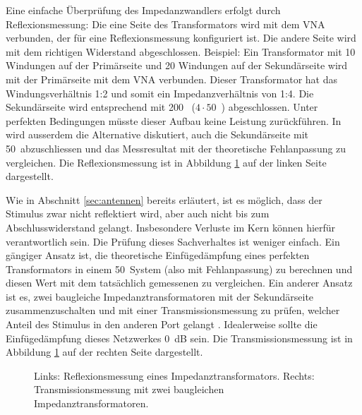 \documentclass[twoside,a4paper,11pt,halfparskip,DIV=11,notitlepage]{scrartcl}
\begin{document}
Eine einfache Überprüfung des Impedanzwandlers erfolgt durch Reflexionsmessung: Die eine Seite
des Transformators wird mit dem VNA verbunden, der für eine Reflexionsmessung konfiguriert ist.
Die andere Seite wird mit dem richtigen Widerstand abgeschlossen. Beispiel: Ein Transformator
mit 10 Windungen auf der Primärseite und 20 Windungen auf der Sekundärseite
wird mit der Primärseite mit dem VNA verbunden. Dieser Transformator hat das Windungsverhältnis
1:2 und somit ein Impedanzverhältnis von 1:4. Die Sekundärseite wird entsprechend mit 200~\Ohm
($4\cdot 50$~\Ohm) abgeschlossen. Unter perfekten Bedingungen müsste dieser Aufbau keine
Leistung zurückführen. In \cite{ferreira2019evaluating} wird ausserdem die Alternative diskutiert,
auch die Sekundärseite mit 50~\Ohm abzuschliessen und das Messresultat mit der theoretische
Fehlanpassung zu vergleichen. Die Reflexionsmessung ist in Abbildung \ref{fig:impedancetransformermeasurement}
auf der linken Seite dargestellt.

Wie in Abschnitt \ref{sec:antennen} bereits erläutert, ist es möglich, dass der Stimulus zwar
nicht reflektiert wird, aber auch nicht bis zum Abschlusswiderstand gelangt. Insbesondere
Verluste im Kern können hierfür verantwortlich sein. Die Prüfung dieses Sachverhaltes ist
weniger einfach. Ein gängiger Ansatz ist, die theoretische Einfügedämpfung eines perfekten
Transformators in einem 50~\Ohm System (also mit Fehlanpassung) zu berechnen und diesen
Wert mit dem tatsächlich gemessenen zu vergleichen. Ein anderer Ansatz ist es,
zwei baugleiche Impedanztransformatoren mit der Sekundärseite
zusammenzuschalten und mit einer Transmissionsmessung zu prüfen, welcher Anteil
des Stimulus in den anderen Port gelangt \cite{ferreira2019evaluating}.
Idealerweise sollte die Einfügedämpfung dieses Netzwerkes 0~dB sein. Die Transmissionsmessung
ist in Abbildung \ref{fig:impedancetransformermeasurement} auf der rechten Seite dargestellt.

\begin{figure}[H]
    \begin{center}\end{center}
     \caption{Links: Reflexionsmessung eines Impedanztransformators. Rechts: Transmissionsmessung
     mit zwei baugleichen Impedanztransformatoren.}
     \label{fig:impedancetransformermeasurement}
\end{figure}
\end{document}
